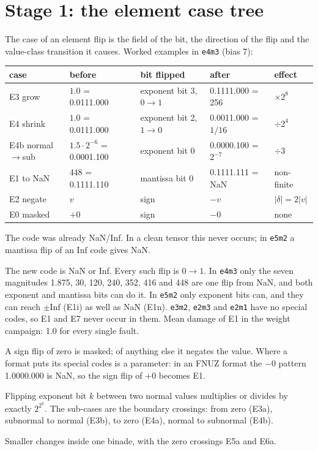 \documentclass[10pt,a4paper]{article}
\newcommand{\fmt}[1]{\texttt{#1}}
\begin{document}
\section{Stage 1: the element case tree}

The case of an element flip is the field of the bit, the direction of the flip and the
value-class transition it causes. Worked examples in \fmt{e4m3} (bias 7):

\begin{center}
\begin{tabular}{lllll}
\toprule
case & before & bit flipped & after & effect \\
\midrule
E3 grow & $1.0$ = 0.0111.000 & exponent bit 3, $0\to1$ & 0.1111.000 = 256 & $\times 2^{8}$ \\
E4 shrink & $1.0$ = 0.0111.000 & exponent bit 2, $1\to0$ & 0.0011.000 = $1/16$ & $\div 2^{4}$ \\
E4b normal$\to$sub & $1.5\cdot2^{-6}$ = 0.0001.100 & exponent bit 0 & 0.0000.100 = $2^{-7}$ & $\div 3$ \\
E1 to NaN & 448 = 0.1111.110 & mantissa bit 0 & 0.1111.111 = NaN & non-finite \\
E2 negate & $v$ & sign & $-v$ & $|\delta| = 2|v|$ \\
E0 masked & $+0$ & sign & $-0$ & none \\
\bottomrule
\end{tabular}
\end{center}

\begin{description}[leftmargin=1.2em,style=nextline]
  \item[E7 from special.] The code was already NaN/Inf. In a clean tensor this never occurs; in
        \fmt{e5m2} a mantissa flip of an Inf code gives NaN.
  \item[E1 to special.] The new code is NaN or Inf. Every such flip is $0\to1$. In \fmt{e4m3}
        only the seven magnitudes 1.875, 30, 120, 240, 352, 416 and 448 are one flip from NaN, and
        both exponent and mantissa bits can do it. In \fmt{e5m2} only exponent bits can, and they can
        reach $\pm$Inf (E1i) as well as NaN (E1n). \fmt{e3m2}, \fmt{e2m3} and \fmt{e2m1} have no
        special codes, so E1 and E7 never occur in them. Mean damage of E1 in the weight campaign:
        1.0 for every single fault.
  \item[E0 / E2 sign.] A sign flip of zero is masked; of anything else it negates the value.
        Where a format puts its special codes is a parameter: in an FNUZ format the $-0$ pattern
        1.0000.000 is NaN, so the sign flip of $+0$ becomes E1.
  \item[E3 / E4 exponent.] Flipping exponent bit $k$ between two normal values multiplies or
        divides by exactly $2^{2^k}$. The sub-cases are the boundary crossings: from zero (E3a),
        subnormal to normal (E3b), to zero (E4a), normal to subnormal (E4b).
  \item[E5 / E6 mantissa.] Smaller changes inside one binade, with the zero crossings E5a and E6a.
\end{description}
\end{document}
